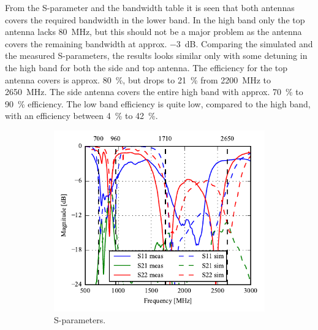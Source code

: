 From the S-parameter and the bandwidth table it is seen that both antennas covers the required bandwidth in the lower band. In the high band only the top antenna lacks \SI{80}{MHz}, but this should not be a major problem as the antenna covers the remaining bandwidth at approx. \SI{-3}{dB}. Comparing the simulated and the measured S-parameters, the results looks similar only with some detuning in the high band for both the side and top antenna.
The efficiency for the top antenna covers is approx. \SI{80}{\percent}, but drops to \SI{21}{\percent} from \SI{2200}{MHz} to \SI{2650}{MHz}. The side antenna covers the entire high band with approx. \SI{70}{\percent} to \SI{90}{\percent} efficiency. The low band efficiency is quite low, compared to the high band, with an efficiency between \SI{4}{\percent} to \SI{42}{\percent}.
 \begin{figure}[htbp]
    \centering
    \begin{subfigure}{0.49\linewidth}
        \includegraphics{img/tech_sol/nonresonant/prototype/sparams.pdf}
        \caption{S-parameters.}
    \end{subfigure}
    \hfill
    \begin{subfigure}{0.49\linewidth}

\end{subfigure}
\end{figure}
